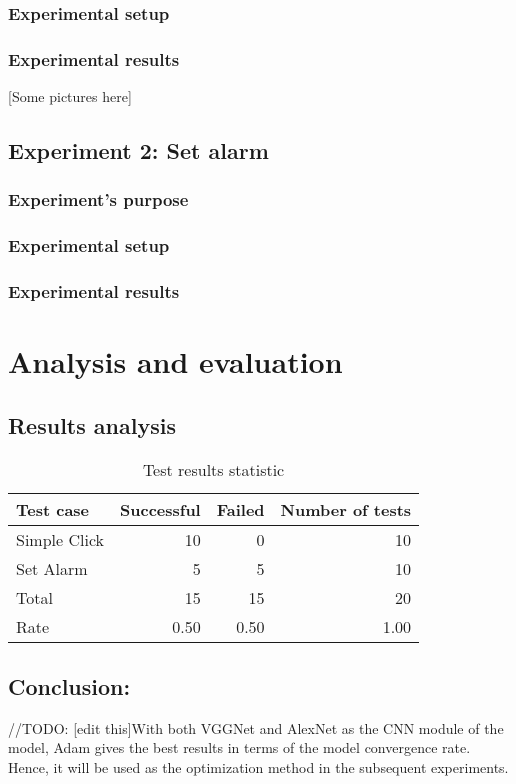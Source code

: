 \subsubsection{Experimental setup}

\subsubsection{Experimental results}
[Some pictures here]

\subsection{Experiment 2: Set alarm}
\subsubsection{Experiment's purpose}

\subsubsection{Experimental setup}

\subsubsection{Experimental results}

\section{Analysis and evaluation}
\subsection{Results analysis}
\begin{table}[H]
	\centering
	\caption{Test results statistic}	
	\label{tab:result_stat}
	\begin{tabularx}{0.65\textwidth}{l|rrr}
		\hline
		Test case & Successful & Failed & Number of tests \\
		\hline
		Simple Click & 10 & 0 & 10 \\
		Set Alarm & 5 & 5 & 10 \\
		\hline
		Total & 15 & 15 & 20 \\
		Rate & 0.50 & 0.50 & 1.00 \\
		\hline
	\end{tabularx}
\end{table}

\subsection{Conclusion:} //TODO: [edit this]With both VGGNet and AlexNet as the CNN module of the model, Adam gives the best results in terms of the model convergence rate. Hence, it will be used as the optimization method in the subsequent experiments.

